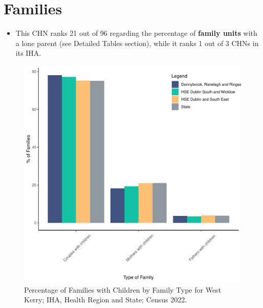 \documentclass{article}
\begin{document}
\section{Families}\label{sect:Fam}
\begin{itemize}
\item This CHN ranks  21 out of 96 regarding the percentage of \textbf{family units} with a lone parent (see Detailed Tables section), while it ranks   1 out of 3 CHNs in its IHA.
\end{itemize}
\begin{figure}[H]
	\centering
	\includegraphics[width = 150mm]{../figures/FamED.pdf}
	\caption{Percentage of Families with Children by Family Type for West Kerry; IHA, Health Region and State; Census 2022.}
	\label{fig:vbnv}
	\end{figure}
	
\end{document}
